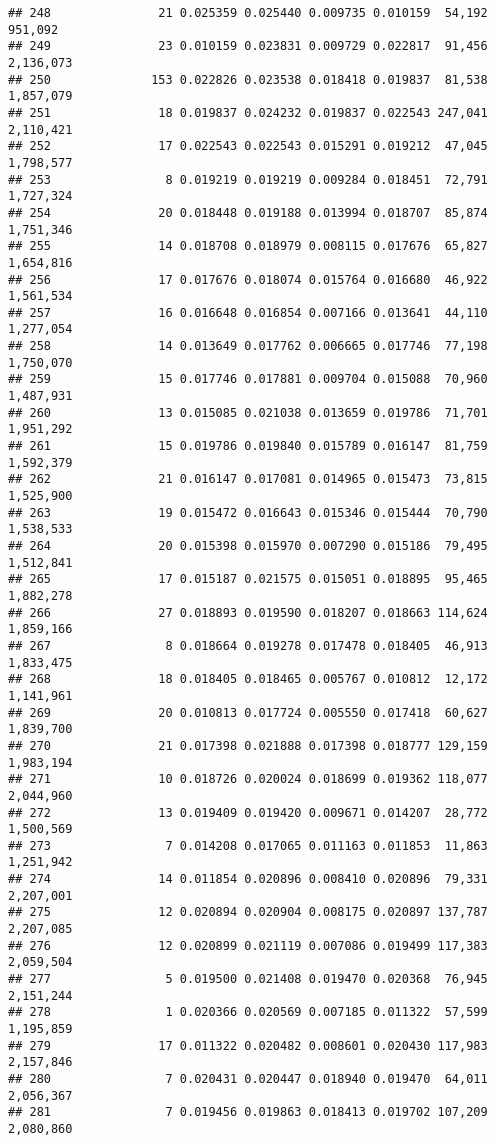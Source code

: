 \documentclass[]{article}
\begin{document}
\begin{verbatim}
## 248               21 0.025359 0.025440 0.009735 0.010159  54,192   951,092
## 249               23 0.010159 0.023831 0.009729 0.022817  91,456 2,136,073
## 250              153 0.022826 0.023538 0.018418 0.019837  81,538 1,857,079
## 251               18 0.019837 0.024232 0.019837 0.022543 247,041 2,110,421
## 252               17 0.022543 0.022543 0.015291 0.019212  47,045 1,798,577
## 253                8 0.019219 0.019219 0.009284 0.018451  72,791 1,727,324
## 254               20 0.018448 0.019188 0.013994 0.018707  85,874 1,751,346
## 255               14 0.018708 0.018979 0.008115 0.017676  65,827 1,654,816
## 256               17 0.017676 0.018074 0.015764 0.016680  46,922 1,561,534
## 257               16 0.016648 0.016854 0.007166 0.013641  44,110 1,277,054
## 258               14 0.013649 0.017762 0.006665 0.017746  77,198 1,750,070
## 259               15 0.017746 0.017881 0.009704 0.015088  70,960 1,487,931
## 260               13 0.015085 0.021038 0.013659 0.019786  71,701 1,951,292
## 261               15 0.019786 0.019840 0.015789 0.016147  81,759 1,592,379
## 262               21 0.016147 0.017081 0.014965 0.015473  73,815 1,525,900
## 263               19 0.015472 0.016643 0.015346 0.015444  70,790 1,538,533
## 264               20 0.015398 0.015970 0.007290 0.015186  79,495 1,512,841
## 265               17 0.015187 0.021575 0.015051 0.018895  95,465 1,882,278
## 266               27 0.018893 0.019590 0.018207 0.018663 114,624 1,859,166
## 267                8 0.018664 0.019278 0.017478 0.018405  46,913 1,833,475
## 268               18 0.018405 0.018465 0.005767 0.010812  12,172 1,141,961
## 269               20 0.010813 0.017724 0.005550 0.017418  60,627 1,839,700
## 270               21 0.017398 0.021888 0.017398 0.018777 129,159 1,983,194
## 271               10 0.018726 0.020024 0.018699 0.019362 118,077 2,044,960
## 272               13 0.019409 0.019420 0.009671 0.014207  28,772 1,500,569
## 273                7 0.014208 0.017065 0.011163 0.011853  11,863 1,251,942
## 274               14 0.011854 0.020896 0.008410 0.020896  79,331 2,207,001
## 275               12 0.020894 0.020904 0.008175 0.020897 137,787 2,207,085
## 276               12 0.020899 0.021119 0.007086 0.019499 117,383 2,059,504
## 277                5 0.019500 0.021408 0.019470 0.020368  76,945 2,151,244
## 278                1 0.020366 0.020569 0.007185 0.011322  57,599 1,195,859
## 279               17 0.011322 0.020482 0.008601 0.020430 117,983 2,157,846
## 280                7 0.020431 0.020447 0.018940 0.019470  64,011 2,056,367
## 281                7 0.019456 0.019863 0.018413 0.019702 107,209 2,080,860

\end{verbatim}
\end{document}
